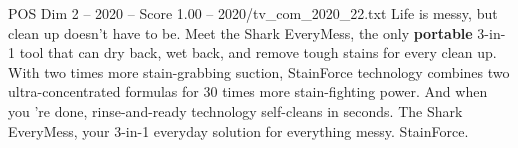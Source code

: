 \begin{textsample}{POS Dim 2 – 2020 – Score 1.00 – 2020/tv\_com\_2020\_22.txt}  \label{ex:f2_pos_077}
Life is messy, but clean up doesn't have to be.
Meet the Shark EveryMess, the only \textbf{portable} 3-in-1 tool that can dry back, wet back, and remove tough stains for every clean up.
With two times more stain-grabbing suction, StainForce technology combines two ultra-concentrated formulas for 30 times more stain-fighting power.
And when you 're done, rinse-and-ready technology self-cleans in seconds.
The Shark EveryMess, your 3-in-1 everyday solution for everything messy.
StainForce.

\end{textsample}
